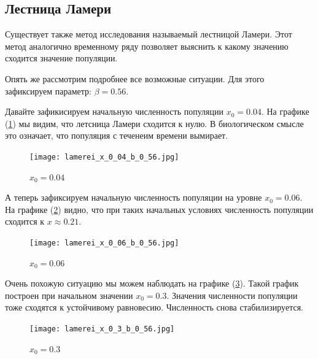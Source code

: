     \subsection{Лестница Ламери}
    
        Существует также метод исследования называемый лестницой Ламери. Этот метод аналогично временному ряду позволяет выяснить к какому значению сходится значение популяции.
            
        Опять же рассмотрим подробнее все возможные ситуации. Для этого зафиксируем параметр: \(\beta = 0.56\). 
    
        Давайте зафикисируем начальную численность популяции \(x_0 = 0.04\). На графике (\ref{lamerei_x_0_04_b_0_56}) мы видим, что летсница Ламери сходится к нулю. В биологическом смысле это означает, что популяция с теченеим времени вымирает.
    
        \begin{figure}
            \centering
            \texttt{[image: lamerei\_x\_0\_04\_b\_0\_56.jpg]}
    
            \captionsetup{justification=centering}
            \caption{\(x_0 = 0.04\)}
            \label{lamerei_x_0_04_b_0_56}
        \end{figure}
    
        А теперь зафиксируем начальную численность популяции на уровне \(x_0 = 0.06\). На графике (\ref{lamerei_x_0_06_b_0_56}) видно, что при таких начальных условиях численность популяции сходится к \(x \approx 0.21\).
            
        \begin{figure}
            \centering
            \texttt{[image: lamerei\_x\_0\_06\_b\_0\_56.jpg]}
    
            \captionsetup{justification=centering}
            \caption{\(x_0 = 0.06\)}
            \label{lamerei_x_0_06_b_0_56}
        \end{figure}
    
        Очень похожую ситуацию мы можем наблюдать на графике (\ref{lamerei_x_0_3_b_0_56}). Такой график построен при начальном значении \(x_0 = 0.3\). Значения численности популяции тоже сходятся к устойчивому равновесию. Численность снова стабилизируется.
            
        \begin{figure}
            \centering
            \texttt{[image: lamerei\_x\_0\_3\_b\_0\_56.jpg]}
    
            \captionsetup{justification=centering}
            \caption{\(x_0 = 0.3\)}
            \label{lamerei_x_0_3_b_0_56}
        \end{figure}
    
